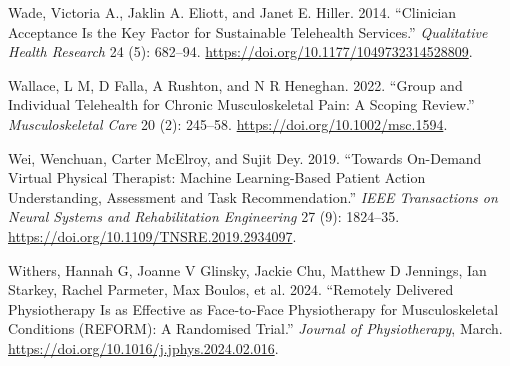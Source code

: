 \documentclass[
  letterpaper,
]{article}
\newlength{\cslhangindent}
\newenvironment{CSLReferences}[2] %
 {\begin{list}{}{%
  \setlength{\itemindent}{0pt}
  \setlength{\leftmargin}{0pt}
  \setlength{\parsep}{0pt}
  \ifodd #1
   \setlength{\leftmargin}{\cslhangindent}
   \setlength{\itemindent}{-1\cslhangindent}
  \fi
  \setlength{\itemsep}{#2\baselineskip}}}
 {\end{list}}
\begin{document}
\begin{CSLReferences}{1}{0}
Wade, Victoria A., Jaklin A. Eliott, and Janet E. Hiller. 2014.
{``Clinician {Acceptance} Is the {Key Factor} for {Sustainable
Telehealth Services}.''} \emph{Qualitative Health Research} 24 (5):
682--94. \url{https://doi.org/10.1177/1049732314528809}.

Wallace, L M, D Falla, A Rushton, and N R Heneghan. 2022. {``Group and
Individual Telehealth for Chronic Musculoskeletal Pain: {A} Scoping
Review.''} \emph{Musculoskeletal Care} 20 (2): 245--58.
\url{https://doi.org/10.1002/msc.1594}.

Wei, Wenchuan, Carter McElroy, and Sujit Dey. 2019. {``Towards
{On-Demand Virtual Physical Therapist}: {Machine Learning-Based Patient
Action Understanding}, {Assessment} and {Task Recommendation}.''}
\emph{IEEE Transactions on Neural Systems and Rehabilitation
Engineering} 27 (9): 1824--35.
\url{https://doi.org/10.1109/TNSRE.2019.2934097}.

Withers, Hannah G, Joanne V Glinsky, Jackie Chu, Matthew D Jennings, Ian
Starkey, Rachel Parmeter, Max Boulos, et al. 2024. {``Remotely Delivered
Physiotherapy Is as Effective as Face-to-Face Physiotherapy for
Musculoskeletal Conditions ({REFORM}): A Randomised Trial.''}
\emph{Journal of Physiotherapy}, March.
\url{https://doi.org/10.1016/j.jphys.2024.02.016}.

\end{CSLReferences}
\end{document}
